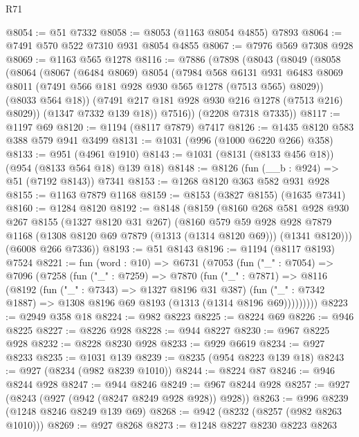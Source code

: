 \begin{lexlean}{R71}
\begin{coremodule}
@8054 := @51 @7332
@8058 := @8053 (@1163 @8054 @4855) @7893
@8064 := @7491 @570 @522 @7310 @931 @8054 @4855
@8067 := @7976 @569 @7308 @928
@8069 := @1163 @565 @1278
@8116 := @7886
    (@7898
      (@8043
        (@8049
          (@8058
            (@8064
              (@8067
                (@6484 @8069)
                @8054
                (@7984
                  @568
                  @6131
                  @931
                  @6483
                  @8069
                  @8011
                  (@7491 @566 @181 @928 @930 @565 @1278 (@7513 @565) @8029))
                (@8033 @564 @18))
              (@7491 @217 @181 @928 @930 @216 @1278 (@7513 @216) @8029))
            (@1347 @7332 @139 @18))
          @7516))
      (@2208 @7318 @7335))
@8117 := @1197 @69
@8120 := @1194 (@8117 @7879) @7417
@8126 := @1435 @8120 @583 @388 @579 @941 @3499
@8131 := @1031 (@996 (@1000 @6220 @266) @358)
@8133 := @951 (@4961 @1910)
@8143 := @1031 (@8131 (@8133 @456 @18)) (@954 (@8133 @564 @18) @139 @18)
@8148 := @8126 (fun (__b : @924) => @51 (@7192 @8143)) @7341
@8153 := @1268 @8120 @363 @582 @931 @928
@8155 := @1163 @7879 @1168
@8159 := @8153 (@3827 @8155) (@1635 @7341)
@8160 := @1284 @8120
@8192 := @8148
    (@8159
      (@8160
        @268
        @581
        @928
        @930
        @267
        @8155
        (@1327 @8120 @31 @267)
        (@8160
          @579
          @59
          @928
          @928
          @7879
          @1168
          (@1308 @8120 @69 @7879 (@1313 (@1314 @8120 @69)))
          (@1341 @8120)))
      (@6008 @266 @7336))
@8193 := @51 @8143
@8196 := @1194 (@8117 @8193) @7524
@8221 := fun (word : @10) =>
  @6731
    (@7053
      (fun ("_" : @7054) =>
      @7096
        (@7258
          (fun ("_" : @7259) =>
          @7870
            (fun ("_" : @7871) =>
            @8116
              (@8192
                (fun ("_" : @7343) => @1327 @8196 @31 @387)
                (fun ("_" : @7342 @1887) => @1308 @8196 @69 @8193 (@1313 (@1314 @8196 @69)))))))))
@8223 := @2949 @358 @18
@8224 := @982 @8223
@8225 := @8224 @69
@8226 := @946 @8225
@8227 := @8226 @928
@8228 := @944 @8227
@8230 := @967 @8225 @928
@8232 := @8228 @8230 @928
@8233 := @929 @6619
@8234 := @927 @8233
@8235 := @1031 @139
@8239 := @8235 (@954 @8223 @139 @18)
@8243 := @927 (@8234 (@982 @8239 @1010))
@8244 := @8224 @87
@8246 := @946 @8244 @928
@8247 := @944 @8246
@8249 := @967 @8244 @928
@8257 := @927 (@8243 (@927 (@942 (@8247 @8249 @928 @928)) @928))
@8263 := @996 @8239 (@1248 @8246 @8249 @139 @69)
@8268 := @942 (@8232 (@8257 (@982 @8263 @1010)))
@8269 := @927 @8268
@8273 := @1248 @8227 @8230 @8223 @8263

\end{coremodule}
\end{lexlean}

